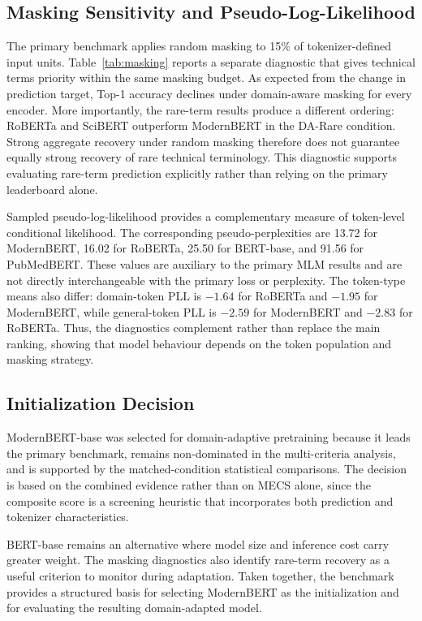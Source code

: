 \subsection{Masking Sensitivity and Pseudo-Log-Likelihood}
\label{sec:masking}


The primary benchmark applies random masking to 15\% of tokenizer-defined input units. Table~\ref{tab:masking} reports a separate diagnostic that gives technical terms priority within the same masking budget. As expected from the change in prediction target, Top-1 accuracy declines under domain-aware masking for every encoder. More importantly, the rare-term results produce a different ordering: RoBERTa and SciBERT outperform ModernBERT in the DA-Rare condition. Strong aggregate recovery under random masking therefore does not guarantee equally strong recovery of rare technical terminology. This diagnostic supports evaluating rare-term prediction explicitly rather than relying on the primary leaderboard alone.

Sampled pseudo-log-likelihood provides a complementary measure of token-level conditional likelihood. The corresponding pseudo-perplexities are 13.72 for ModernBERT, 16.02 for RoBERTa, 25.50 for BERT-base, and 91.56 for PubMedBERT. These values are auxiliary to the primary MLM results and are not directly interchangeable with the primary loss or perplexity. The token-type means also differ: domain-token PLL is $-1.64$ for RoBERTa and $-1.95$ for ModernBERT, while general-token PLL is $-2.59$ for ModernBERT and $-2.83$ for RoBERTa. Thus, the diagnostics complement rather than replace the main ranking, showing that model behaviour depends on the token population and masking strategy.

\subsection{Initialization Decision}
\label{sec:decision}

ModernBERT-base was selected for domain-adaptive pretraining because it leads the primary benchmark, remains non-dominated in the multi-criteria analysis, and is supported by the matched-condition statistical comparisons. The decision is based on the combined evidence rather than on MECS alone, since the composite score is a screening heuristic that incorporates both prediction and tokenizer characteristics.

BERT-base remains an alternative where model size and inference cost carry greater weight. The masking diagnostics also identify rare-term recovery as a useful criterion to monitor during adaptation. Taken together, the benchmark provides a structured basis for selecting ModernBERT as the initialization and for evaluating the resulting domain-adapted model.
